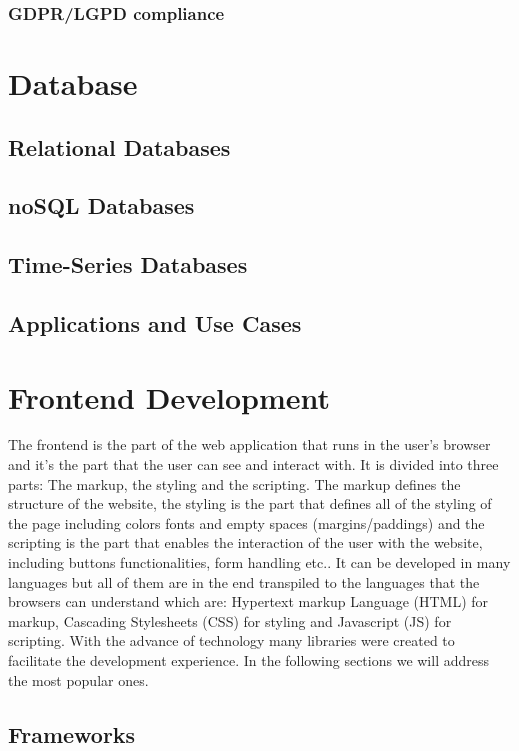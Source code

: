 \subsubsection{GDPR/LGPD compliance}


\section{Database}
\subsection{Relational Databases}
\subsection{noSQL Databases}
\subsection{Time-Series Databases}
\subsection{Applications and Use Cases}

\section{Frontend Development}
The frontend is the part of the web application that runs in the user's
browser and it's the part that the user can see and interact with.
It is divided into three parts: The markup, the styling and the scripting.
The markup defines the structure of the website, the styling is the part that
defines all of the styling of the page including colors fonts and empty spaces
(margins/paddings) and the scripting is the part that enables the interaction
of the user with the website, including buttons functionalities, form handling
etc..
It can be developed in many languages but all of them are in the end transpiled
to the languages that the browsers can understand which are: Hypertext markup
Language (HTML) for markup, Cascading Stylesheets (CSS) for styling and
Javascript (JS) for scripting.
With the advance of technology many libraries were created to facilitate the
development experience. In the following sections we will address the most
popular ones.

\subsection{Frameworks}

